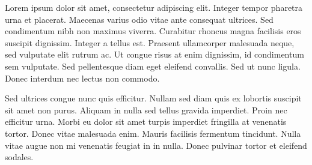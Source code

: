 \newcommand{\KeywordsAbstract}{Keyword1, Keyword2, Keyword3}

Lorem ipsum dolor sit amet, consectetur adipiscing elit. Integer tempor pharetra urna et placerat. Maecenas varius odio vitae ante consequat ultrices. Sed condimentum nibh non maximus viverra. Curabitur rhoncus magna facilisis eros suscipit dignissim. Integer a tellus est. Praesent ullamcorper malesuada neque, sed vulputate elit rutrum ac. Ut congue risus at enim dignissim, id condimentum sem vulputate. Sed pellentesque diam eget eleifend convallis. Sed ut nunc ligula. Donec interdum nec lectus non commodo.

Sed ultrices congue nunc quis efficitur. Nullam sed diam quis ex lobortis suscipit sit amet non purus. Aliquam in nulla sed tellus gravida imperdiet. Proin nec efficitur urna. Morbi eu dolor sit amet turpis imperdiet fringilla at venenatis tortor. Donec vitae malesuada enim. Mauris facilisis fermentum tincidunt. Nulla vitae augue non mi venenatis feugiat in in nulla. Donec pulvinar tortor et eleifend sodales.